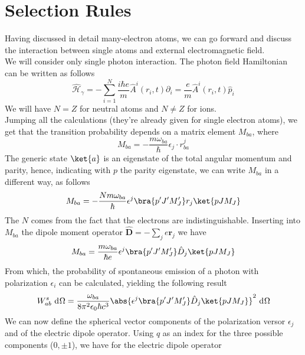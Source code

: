 \documentclass[a4paper, 11pt]{book}
\renewcommand{\vec}[1]{\mathbf{#1}}
\newcommand{\1}{\opr{\mathds{1}}}
\newcommand{\diff}[2][]{\ \mathrm{d}^{#1}#2}
\newcommand{\ham}{\mathcal{H}}
\newcommand{\opr}[1]{\hat{#1}}
\newcommand{\vecopr}[1]{\opr{\vec{#1}}}
\theoremstyle{plain}
\begin{document}
	\section{Selection Rules}
	Having discussed in detail many-electron atoms, we can go forward and discuss the interaction between single atoms and external electromagnetic field.\\
	We will consider only single photon interaction. The photon field Hamiltonian can be written as follows
	\begin{equation}
		\opr{\ham}_{\gamma}=-\sum_{i=1}^N\frac{i\hbar e}{m}\opr{A}^i(r_i,t)\partial_i=\frac{e}{m}\opr{A}^i(r_i,t)\opr{p}_i
		\label{eq:photonhamiltonian}
	\end{equation}
	We will have $N=Z$ for neutral atoms and $N\ne Z$ for ions.\\
	Jumping all the calculations (they're already given for single electron atoms), we get that the transition probability depends on a matrix element $M_{ba}$, where
	\begin{equation}
		M_{ba}=-\frac{m\omega_{ba}}{\hbar}\epsilon_j\cdot r^j_{ba}
		\label{eq:transitionmatrixmanyelecem}
	\end{equation}
	The generic state $\ket{a}$ is an eigenstate of the total angular momentum and parity, hence, indicating with $p$ the parity eigenstate, we can write $M_{ba}$ in a different way, as follows
	\begin{equation}
		M_{ba}=-\frac{Nm\omega_{ba}}{\hbar}\epsilon^j\bra{p'J'M_J'}r_j\ket{pJM_J}
		\label{eq:mbawithnewbasis}
	\end{equation}
	The $N$ comes from the fact that the electrons are indistinguishable. Inserting into $M_{ba}$ the dipole moment operator $\vecopr{D}=-\sum_je\vec{r}_j$ we have
	\begin{equation}
		M_{ba}=\frac{m\omega_{ba}}{\hbar e}\epsilon^j\bra{p'J'M_J'}\opr{D}_j\ket{pJM_J}
		\label{eq:dipolemomentinsideM}
	\end{equation}
	From which, the probability of spontaneous emission of a photon with polarization $\epsilon_i$ can be calculated, yielding the following result
	\begin{equation}
		W^s_{ab}\diff{\Omega}=\frac{\omega_{ba}}{8\pi^2\epsilon_0\hbar c^3}\abs{\epsilon^j\bra{p'J'M_J'}\opr{D}_j\ket{pJM_J}}^2\diff{\Omega}
		\label{eq:seprobmanyelec}
	\end{equation}
	We can now define the spherical vector components of the polarization versor $\epsilon_j$ and of the electric dipole operator. Using $q$ as an index for the three possible components ($0,\pm1$), we have for the electric dipole operator
\end{document}
